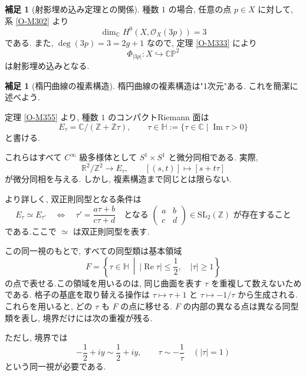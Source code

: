 \documentclass[dvipdfmx,a4paper,11pt]{article} %
\newcommand{\C}{\mathbb{C}}
\theoremstyle{definition}
\numberwithin{equation}{section}
\newtheorem{rem}[thm]{補足}
\begin{document}
\begin{rem}[射影埋め込み定理との関係]\label{O-M356}
種数 $1$ の場合, 任意の点 $p\in X$ に対して, 
系 \ref{O-M302} より
\[
\dim_{\mathbb C}H^0(X,\mathcal O_X(3p))=3
\]
である.
また, $\deg(3p)=3=2g+1$ なので, 
定理 \ref{O-M333} により
\[
\Phi_{|3p|}:X\hookrightarrow\C\mathbb P^2
\]
は射影埋め込みとなる.
\end{rem}

\begin{rem}[楕円曲線の複素構造]\label{O-M360}
楕円曲線の複素構造は"1次元"ある. これを簡潔に述べよう. 

定理 \ref{O-M355} より, 種数 $1$ のコンパクトRiemann 面は
\[
E_\tau=\mathbb C/(\mathbb Z+\mathbb Z\tau),
\qquad
\tau\in\mathbb H
:=\{\tau\in\mathbb C\mid\operatorname{Im}\tau>0\}
\]
と書ける.

これらはすべて $C^\infty$ 級多様体として
$S^1\times S^1$ と微分同相である.
実際, 
\[
\mathbb R^2/\mathbb Z^2\longrightarrow E_\tau,
\qquad
[(s,t)]\longmapsto[s+t\tau]
\]
が微分同相を与える.
しかし, 複素構造まで同じとは限らない.

より詳しく, 双正則同型となる条件は
\[
E_\tau\simeq E_{\tau'}
\quad\Longleftrightarrow\quad
\tau'=\frac{a\tau+b}{c\tau+d}
\quad
\text{となる }
\begin{pmatrix}a&b\\c&d\end{pmatrix}
\in\mathrm{SL}_2(\mathbb Z)
\text{ が存在すること}
\]
である.ここで $\simeq$ は双正則同型を表す.

この同一視のもとで, すべての同型類は基本領域
\[
F=
\left\{
\tau\in\mathbb H
\ \middle|\
|\operatorname{Re}\tau|\leq\frac12,\quad |\tau|\geq1
\right\}
\]
の点で表せる.この領域を用いるのは, 同じ曲面を表す $\tau$ を重複して数えないためである.
格子の基底を取り替える操作は $\tau\mapsto\tau+1$ と $\tau\mapsto-1/\tau$ から生成される.
これらを用いると, どの $\tau$ も $F$ の点に移せる.
$F$ の内部の異なる点は異なる同型類を表し, 境界だけには次の重複が残る.

ただし, 境界では
\[
-\frac12+iy\sim\frac12+iy,
\qquad
\tau\sim-\frac1\tau
\quad(|\tau|=1)
\]
という同一視が必要である.

\begin{center}
\end{center}
\end{rem}
\end{document}

